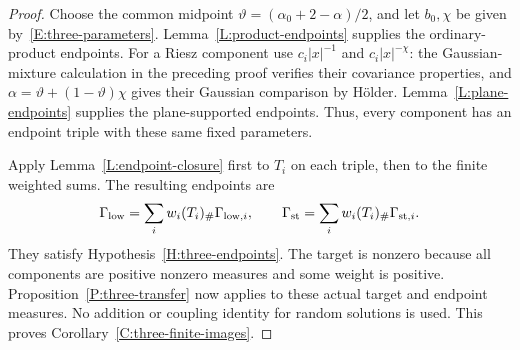 \documentclass[12pt,oneside,openany]{book}
\numberwithin{equation}{section}
\theoremstyle{nogostyle}
\theoremstyle{definition}
\begin{document}
\begin{proof}
  Choose the common midpoint $\vartheta = (\alpha_0+2-\alpha)/2$, and let
  $b_0,\chi$ be given by~\eqref{E:three-parameters}.
  Lemma~\ref{L:product-endpoints} supplies the ordinary-product endpoints. For a
  Riesz component use $c_i|x|^{-1}$ and $c_i|x|^{-\chi}$: the Gaussian-mixture
  calculation in the preceding proof verifies their covariance properties, and
  $\alpha = \vartheta+(1-\vartheta)\chi$ gives their Gaussian comparison by
  H\"older. Lemma~\ref{L:plane-endpoints} supplies the plane-supported
  endpoints. Thus, every component has an endpoint triple with these same fixed
  parameters.

  Apply Lemma~\ref{L:endpoint-closure} first to $T_i$ on each triple, then to
  the finite weighted sums. The resulting endpoints are
  \[
    \Gamma_{\rm low}=\sum_iw_i(T_i)_\#\Gamma_{{\rm low},i},
    \qquad
    \Gamma_{\rm st}=\sum_iw_i(T_i)_\#\Gamma_{{\rm st},i}.
  \]
  They satisfy Hypothesis~\ref{H:three-endpoints}. The target is nonzero because
  all components are positive nonzero measures and some weight is positive.
  Proposition~\ref{P:three-transfer} now applies to these actual target and
  endpoint measures. No addition or coupling identity for random solutions is
  used. This proves Corollary~\ref{C:three-finite-images}.
\end{proof}
\end{document}

